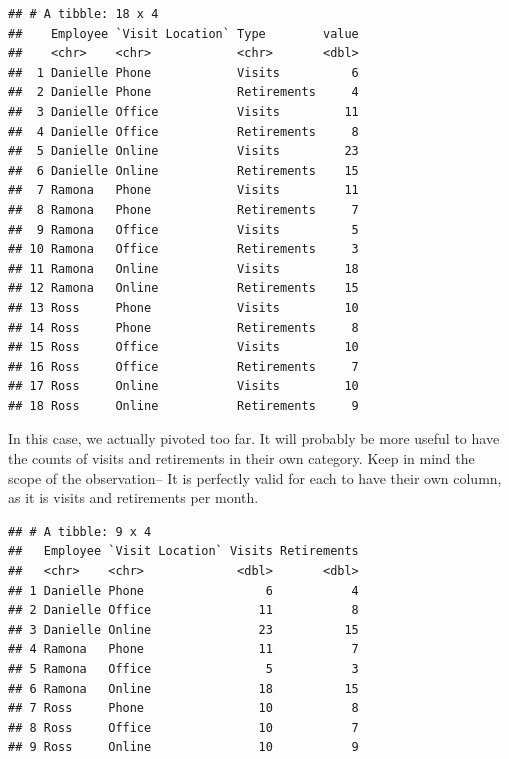 \documentclass[]{book}
\newenvironment{Shaded}{\begin{snugshade}}{\end{snugshade}}
\newcommand{\DataTypeTok}[1]{\textcolor[rgb]{0.13,0.29,0.53}{#1}}
\newcommand{\KeywordTok}[1]{\textcolor[rgb]{0.13,0.29,0.53}{\textbf{#1}}}
\newcommand{\NormalTok}[1]{#1}
\newcommand{\OperatorTok}[1]{\textcolor[rgb]{0.81,0.36,0.00}{\textbf{#1}}}
\newcommand{\StringTok}[1]{\textcolor[rgb]{0.31,0.60,0.02}{#1}}
\begin{document}
\begin{verbatim}
## # A tibble: 18 x 4
##    Employee `Visit Location` Type        value
##    <chr>    <chr>            <chr>       <dbl>
##  1 Danielle Phone            Visits          6
##  2 Danielle Phone            Retirements     4
##  3 Danielle Office           Visits         11
##  4 Danielle Office           Retirements     8
##  5 Danielle Online           Visits         23
##  6 Danielle Online           Retirements    15
##  7 Ramona   Phone            Visits         11
##  8 Ramona   Phone            Retirements     7
##  9 Ramona   Office           Visits          5
## 10 Ramona   Office           Retirements     3
## 11 Ramona   Online           Visits         18
## 12 Ramona   Online           Retirements    15
## 13 Ross     Phone            Visits         10
## 14 Ross     Phone            Retirements     8
## 15 Ross     Office           Visits         10
## 16 Ross     Office           Retirements     7
## 17 Ross     Online           Visits         10
## 18 Ross     Online           Retirements     9
\end{verbatim}

In this case, we actually pivoted too far. It will probably be more useful to have the counts of visits and retirements in their own category. Keep in mind the scope of the observation-- It is perfectly valid for each to have their own column, as it is visits and retirements per month.

\begin{Shaded}
\end{Shaded}

\begin{verbatim}
## # A tibble: 9 x 4
##   Employee `Visit Location` Visits Retirements
##   <chr>    <chr>             <dbl>       <dbl>
## 1 Danielle Phone                 6           4
## 2 Danielle Office               11           8
## 3 Danielle Online               23          15
## 4 Ramona   Phone                11           7
## 5 Ramona   Office                5           3
## 6 Ramona   Online               18          15
## 7 Ross     Phone                10           8
## 8 Ross     Office               10           7
## 9 Ross     Online               10           9
\end{verbatim}
\end{document}
